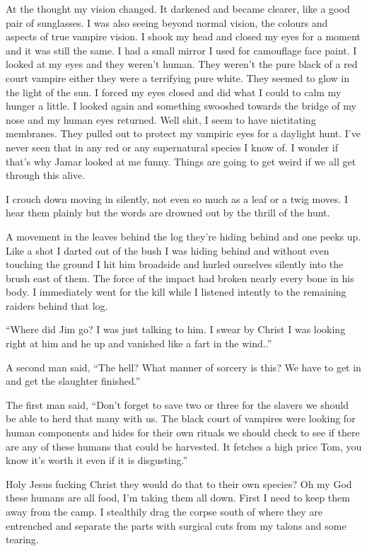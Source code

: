 At the thought my vision changed. It darkened and became clearer, like a good pair of sunglasses. I was also seeing beyond normal vision, the colours and aspects of true vampire vision. I shook my head and closed my eyes for a moment and it was still the same. I had a small mirror I used for camouflage face paint. I looked at my eyes and they weren't human. They weren't the pure black of a red court vampire either they were a terrifying pure white. They seemed to glow in the light of the sun. I forced my eyes closed and did what I could to calm my hunger a little. I looked again and something swooshed towards the bridge of my nose and my human eyes returned. Well shit, I seem to have nictitating membranes. They pulled out to protect my vampiric eyes for a daylight hunt. I've never seen that in any red or any supernatural species I know of. I wonder if that's why Jamar looked at me funny. Things are going to get weird if we all get through this alive.

I  crouch down moving in silently, not even so much as a leaf or a twig moves. I hear them plainly but the words are drowned out by the thrill of the hunt. 

A movement in the leaves behind the log they're hiding behind and one peeks up. Like a shot I darted out of the bush I was hiding behind and without even touching the ground I hit him broadside and hurled ourselves silently into the brush east of them. The force of the impact had broken nearly every bone in his body. I immediately went for the kill while I listened intently to the remaining raiders behind that log.

``Where did Jim go? I was just talking to him. I swear by Christ I was looking right at him and he up and vanished like a fart in the wind..''

A second man said, ``The hell? What manner of sorcery is this? We have to get in and get the slaughter finished.''

The first man said, ``Don't forget to save two or three for the slavers we should be able to herd that many with us. The black court of vampires were looking for human components and hides for their own rituals we should check to see if there are any of these humans that could be harvested. It fetches a high price Tom, you know it's worth it even if it is disgusting.''

Holy Jesus fucking Christ they would do that to their own species? Oh my God these humans are all food, I'm taking them all down. First I need to keep them away from the camp. I stealthily drag the corpse south of where they are entrenched and separate the parts with surgical cuts from my talons and some tearing.

